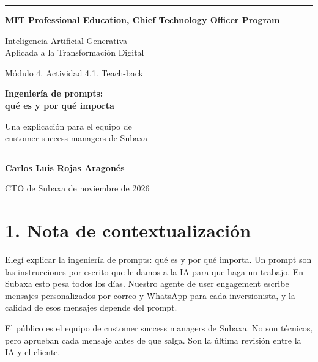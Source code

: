 \documentclass[11pt,letterpaper]{article}
\begin{document}
\begin{titlepage}
\raggedright
{\color{mitRojo}\rule{\textwidth}{3pt}\par}
\vspace{0.4cm}
{\small\bfseries\color{mitGris}MIT Professional Education,
Chief Technology Officer Program\par}
\vspace{4.0cm}
{\large Inteligencia Artificial Generativa\\
Aplicada a la Transformación Digital\par}
\vspace{0.4cm}
{\normalsize\color{mitGris}Módulo 4. Actividad 4.1. Teach-back\par}
\vspace{1.4cm}
{\fontsize{30}{36}\selectfont\bfseries\color{mitRojo}
Ingeniería de prompts:\\ qué es y por qué importa\par}
\vspace{0.6cm}
{\large Una explicación para el equipo de\\
customer success managers de Subaxa\par}
\vfill
{\color{mitGris}\rule{\textwidth}{0.6pt}\par}
\vspace{0.3cm}
{\large\bfseries Carlos Luis Rojas Aragonés\par}
\vspace{0.1cm}
{\normalsize\color{mitGris}CTO de Subaxa\quad\textbar{} de noviembre de 2026\par}
\restoregeometry
\end{titlepage}

\section*{1. Nota de contextualización}

Elegí explicar la ingeniería de prompts: qué es y por qué importa. Un prompt
son las instrucciones por escrito que le damos a la IA para que haga un
trabajo. En Subaxa esto pesa todos los días. Nuestro agente de user
engagement escribe mensajes personalizados por correo y WhatsApp para cada
inversionista, y la calidad de esos mensajes depende del prompt.

El público es el equipo de customer success managers de Subaxa. No son
técnicos, pero aprueban cada mensaje antes de que salga. Son la última
revisión entre la IA y el cliente.
\end{document}
